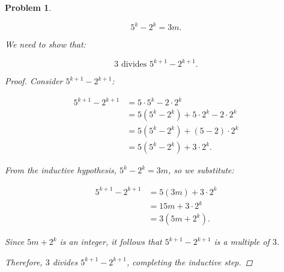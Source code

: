 \documentclass[12pt]{article}
\newtheorem{problem}{Problem}
\theoremstyle{definition}
\begin{document}
\begin{problem}
\begin{enumerate}[label=(\alph*)]
    \[
    5^k - 2^k = 3m.
    \]

    We need to show that:

    \[
    3 \text{ divides } 5^{k+1} - 2^{k+1}.
    \]

    \begin{proof}
    Consider \( 5^{k+1} - 2^{k+1} \):

    \[
    \begin{aligned}
    5^{k+1} - 2^{k+1} &= 5 \cdot 5^k - 2 \cdot 2^k \\
    &= 5(5^k - 2^k) + 5 \cdot 2^k - 2 \cdot 2^k \\
    &= 5(5^k - 2^k) + (5 - 2) \cdot 2^k \\
    &= 5(5^k - 2^k) + 3 \cdot 2^k.
    \end{aligned}
    \]

    From the inductive hypothesis, \( 5^k - 2^k = 3m \), so we substitute:

    \[
    \begin{aligned}
    5^{k+1} - 2^{k+1} &= 5(3m) + 3 \cdot 2^k \\
    &= 15m + 3 \cdot 2^k \\
    &= 3(5m + 2^k).
    \end{aligned}
    \]

    Since \( 5m + 2^k \) is an integer, it follows that \( 5^{k+1} - 2^{k+1} \) is a multiple of \( 3 \).

    Therefore, \( 3 \) divides \( 5^{k+1} - 2^{k+1} \), completing the inductive step.
    \end{proof}


\end{enumerate}
\end{problem}
\end{document}

